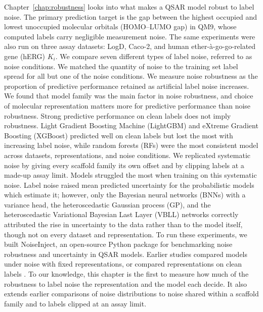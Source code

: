 Chapter~\ref{chap:robustness} looks into what makes a QSAR model robust to label noise. The primary prediction target is the gap between the highest occupied and lowest unoccupied molecular orbitals (HOMO--LUMO gap) in QM9, whose computed labels carry negligible measurement noise. The same experiments were also run on three assay datasets: LogD, Caco-2, and human ether-\`a-go-go-related gene (hERG) $K_i$. We compare seven different types of label noise, referred to as noise conditions. We matched the quantity of noise to the training set label spread for all but one of the noise conditions. We measure noise robustness as the proportion of predictive performance retained as artificial label noise increases. We found that model family was the main factor in noise robustness, and choice of molecular representation matters more for predictive performance than noise robustness. Strong predictive performance on clean labels does not imply robustness. Light Gradient Boosting Machine (LightGBM) and eXtreme Gradient Boosting (XGBoost) predicted well on clean labels but lost the most with increasing label noise, while random forests (RFs) were the most consistent model across datasets, representations, and noise conditions. We replicated systematic noise by giving every scaffold family its own offset and by clipping labels at a made-up assay limit. Models struggled the most when training on this systematic noise. Label noise raised mean predicted uncertainty for the probabilistic models which estimate it; however, only the Bayesian neural networks (BNNs) with a variance head, the heteroscedastic Gaussian process (GP), and the heteroscedastic Variational Bayesian Last Layer (VBLL) networks correctly attributed the rise in uncertainty to the data rather than to the model itself, though not on every dataset and representation. To run these experiments, we built NoiseInject, an open-source Python package for benchmarking noise robustness and uncertainty in QSAR models.
Earlier studies compared models under noise with fixed representations, or compared representations on clean labels \citep{Cortes2015}. To our knowledge, this chapter is the first to measure how much of the robustness to label noise the representation and the model each decide. It also extends earlier comparisons of noise distributions \citep{Heid2023} to noise shared within a scaffold family and to labels clipped at an assay limit. 

